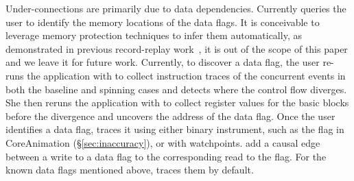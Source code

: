 Under-connections are primarily due to data dependencies.  Currently \xxx
queries the user to identify the memory locations of the data flags. It
is conceivable to leverage memory protection techniques to infer them
automatically, as demonstrated in previous record-replay
work~\cite{king2005debugging, dunlap2008execution}, it is out of the scope
of this paper and we leave it for future work. Currently, to discover a data
flag, the user re-runs the application with \xxx to collect instruction traces
of the concurrent events in both the baseline and spinning cases and detects
where the control flow diverges. She then reruns the application with \xxx to
collect register values for the basic blocks before the divergence and uncovers
the address of the data flag. Once the user identifies a data flag, \xxx traces
it using either binary instrument, such as the  flag in
CoreAnimation (\S\ref{sec:inaccuracy}), or with watchpoints. \xxx add a causal
edge between a write to a data flag to the corresponding read to the flag.
For the known data flags mentioned above, \xxx traces them by default.
